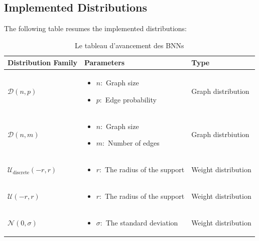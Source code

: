 \subsection{Implemented Distributions}
The following table resumes the implemented distributions:
\begin{table}[h]
	\small
	\begin{tabularx}{\textwidth}{| X | X | X |}
		\hline
		
		Distribution Family & Parameters & Type  \\
		\hline
		$\mathcal{D}(n,p)$ & \vspace{-5mm}
		\begin{itemize}
			  \setlength\itemsep{0em}
			\item $n:$ Graph size
			\item $p:$ Edge probability
		\end{itemize} & Graph distribution \\
		\hline
		$\mathcal{D}(n,m)$ & 
		\vspace{-5mm}
		\begin{itemize}
			  \setlength\itemsep{0em}
			\item $n:$ Graph size
			\item $m:$ Number of edges
		\end{itemize} & Graph distrbiution  \\
		\hline
		$\mathcal{U}_{\text{discrete}}(-r,r)$ &
		\vspace{-5mm}
		\begin{itemize}
			  \setlength\itemsep{0em}
			\item $r:$ The radius of the support
		\end{itemize}
		 &  Weight distribution\\
		\hline
		$\mathcal{U}(-r,r)$ &\vspace{-5mm}
		\begin{itemize}
			  \setlength\itemsep{0em}
			\item $r:$ The radius of the support
		\end{itemize} & Weight distribution \\
		\hline
		$\mathcal{N}(0,\sigma)$ &
		\vspace{-5mm}
		\begin{itemize}
			  \setlength\itemsep{0em}
			\item $\sigma:$ The standard deviation
		\end{itemize} & Weight distribution\\ 
		\hline 
		
	\end{tabularx}
	\caption{Le tableau d'avancement des BNNs
	\label{table:Distributions}}
\end{table}
